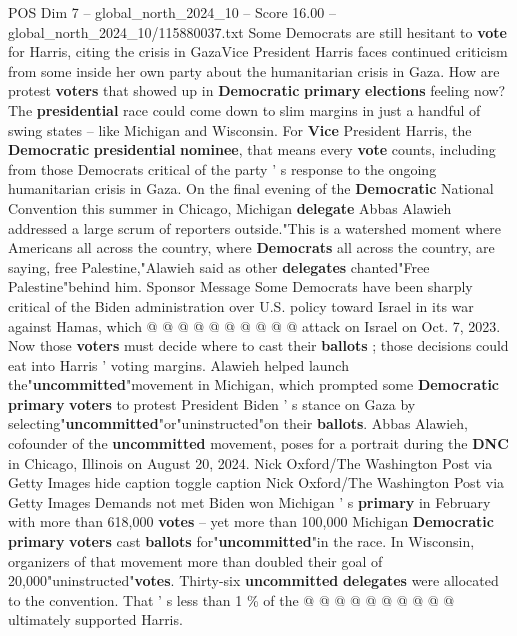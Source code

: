 \begin{textsample}{POS Dim 7 – global\_north\_2024\_10 – Score 16.00 – global\_north\_2024\_10/115880037.txt}  \label{ex:f7_pos_091}
Some Democrats are still hesitant to \textbf{vote} for Harris, citing the crisis in GazaVice President Harris faces continued criticism from some inside her own party about the humanitarian crisis in Gaza.
How are protest \textbf{voters} that showed up in \textbf{Democratic} \textbf{primary} \textbf{elections} feeling now?
The \textbf{presidential} race could come down to slim margins in just a handful of swing states -- like Michigan and Wisconsin.
For \textbf{Vice} President Harris, the \textbf{Democratic} \textbf{presidential} \textbf{nominee}, that means every \textbf{vote} counts, including from those Democrats critical of the party ' s response to the ongoing humanitarian crisis in Gaza.
On the final evening of the \textbf{Democratic} National Convention this summer in Chicago, Michigan \textbf{delegate} Abbas Alawieh addressed a large scrum of reporters outside."This is a watershed moment where Americans all across the country, where \textbf{Democrats} all across the country, are saying, free Palestine,"Alawieh said as other \textbf{delegates} chanted"Free Palestine"behind him.
Sponsor Message Some Democrats have been sharply critical of the Biden administration over U.S. policy toward Israel in its war against Hamas, which @ @ @ @ @ @ @ @ @ @ attack on Israel on Oct. 7, 2023.
Now those \textbf{voters} must decide where to cast their \textbf{ballots} ; those decisions could eat into Harris ' voting margins.
Alawieh helped launch the"\textbf{uncommitted}"movement in Michigan, which prompted some \textbf{Democratic} \textbf{primary} \textbf{voters} to protest President Biden ' s stance on Gaza by selecting"\textbf{uncommitted}"or"uninstructed"on their \textbf{ballots}.
Abbas Alawieh, cofounder of the \textbf{uncommitted} movement, poses for a portrait during the \textbf{DNC} in Chicago, Illinois on August 20, 2024.
Nick Oxford/The Washington Post via Getty Images hide caption toggle caption Nick Oxford/The Washington Post via Getty Images Demands not met Biden won Michigan ' s \textbf{primary} in February with more than 618,000 \textbf{votes} -- yet more than 100,000 Michigan \textbf{Democratic} \textbf{primary} \textbf{voters} cast \textbf{ballots} for"\textbf{uncommitted}"in the race.
In Wisconsin, organizers of that movement more than doubled their goal of 20,000"uninstructed"\textbf{votes}.
Thirty-six \textbf{uncommitted} \textbf{delegates} were allocated to the convention.
That ' s less than 1 \% of the @ @ @ @ @ @ @ @ @ @ ultimately supported Harris.

\end{textsample}
